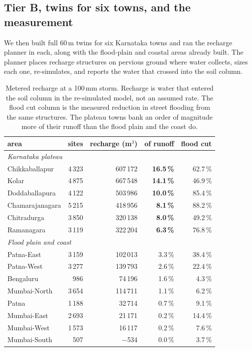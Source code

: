 \subsection{Tier B, twins for six towns, and the measurement}
We then built full 60\,m twins for six Karnataka towns and ran the recharge planner in each, along
with the flood-plain and coastal areas already built. The planner places recharge structures on
pervious ground where water collects, sizes each one, re-simulates, and reports the water that
crossed into the soil column.

\begin{table}[!t]
\centering
\caption{Metered recharge at a 100\,mm storm. Recharge is water that entered the soil column in the
re-simulated model, not an assumed rate. The flood cut column is the measured reduction in street
flooding from the same structures. The plateau towns bank an order of magnitude more of their runoff
than the flood plain and the coast do.}
\label{tab:recharge}
\begin{tabular}{lrrrr}
\toprule
area & sites & recharge (m$^3$) & of runoff & flood cut \\
\midrule
\multicolumn{5}{l}{\emph{Karnataka plateau}}\\
Chikkaballapur   & 4\,323 & 607\,172 & \textbf{16.5\,\%} & 62.7\,\% \\
Kolar            & 4\,875 & 667\,548 & \textbf{14.1\,\%} & 46.9\,\% \\
Doddaballapura   & 4\,122 & 503\,986 & \textbf{10.0\,\%} & 85.4\,\% \\
Chamarajanagara  & 5\,215 & 418\,956 & \textbf{8.1\,\%}  & 88.2\,\% \\
Chitradurga      & 3\,850 & 320\,138 & \textbf{8.0\,\%}  & 49.2\,\% \\
Ramanagara       & 3\,119 & 322\,204 & \textbf{6.3\,\%}  & 76.8\,\% \\
\midrule
\multicolumn{5}{l}{\emph{Flood plain and coast}}\\
Patna-East       & 3\,159 & 102\,013 & 3.3\,\% & 38.4\,\% \\
Patna-West       & 3\,277 & 139\,793 & 2.6\,\% & 22.4\,\% \\
Bengaluru        &    986 &  74\,196 & 1.6\,\% & 4.3\,\% \\
Mumbai-North     & 3\,654 & 114\,711 & 1.1\,\% & 6.2\,\% \\
Patna            & 1\,188 &  32\,714 & 0.7\,\% & 9.1\,\% \\
Mumbai-East      & 2\,693 &  21\,171 & 0.2\,\% & 14.4\,\% \\
Mumbai-West      & 1\,573 &  16\,117 & 0.2\,\% & 7.6\,\% \\
Mumbai-South     &    507 &    $-$534 & 0.0\,\% & 3.7\,\% \\
\bottomrule
\end{tabular}
\end{table}


